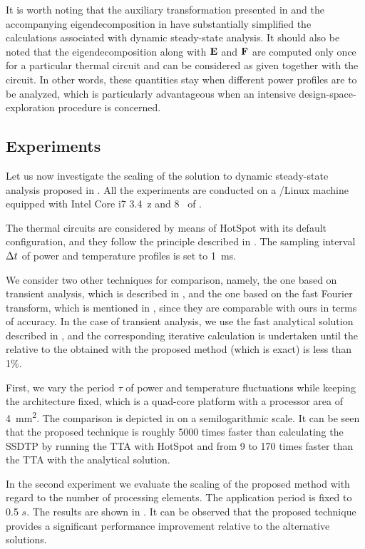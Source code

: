 It is worth noting that the auxiliary transformation presented in
 and the accompanying eigendecomposition in
 have substantially simplified the calculations
associated with dynamic steady-state analysis. It should also be noted that the
eigendecomposition along with $\mathbf{E}$ and $\mathbf{F}$ are computed only once for a
particular thermal  circuit and can be considered as given together with
the circuit. In other words, these quantities stay when different power profiles
are to be analyzed, which is particularly advantageous when an intensive
design-space-exploration procedure is concerned.

\subsection{Experiments}

Let us now investigate the scaling of the solution to dynamic steady-state
analysis proposed in . All the experiments
are conducted on a /Linux machine equipped with Intel Core i7
3.4~z and 8~ of .

The thermal  circuits are considered by means of HotSpot
\cite{skadron2003} with its default configuration, and they follow the principle
described in . The sampling interval $\Delta t$ of power and
temperature profiles is set to 1~ms.

We consider two other techniques for comparison, namely, the one based on
transient analysis, which is described in , and
the one based on the fast Fourier transform, which is mentioned in
, since they are comparable with ours in
terms of accuracy. In the case of transient analysis, we use the fast analytical
solution described in , and the corresponding
iterative calculation is undertaken until the  relative to the
 obtained with the proposed method (which is exact) is less than 1\%.

First, we vary the period $\tau$ of power and temperature fluctuations while
keeping the architecture fixed, which is a quad-core platform with a processor
area of 4~mm\textsuperscript{2}. The comparison is depicted in
 on a semilogarithmic scale. It can be seen that the
proposed technique is roughly 5000 times faster than calculating the SSDTP by
running the TTA with HotSpot and from 9 to 170 times faster than the TTA with
the analytical solution.

In the second experiment we evaluate the scaling of the proposed method with
regard to the number of processing elements. The application period is fixed to
0.5 $s$. The results are shown in . It can be observed that
the proposed technique provides a significant performance improvement relative
to the alternative solutions.
